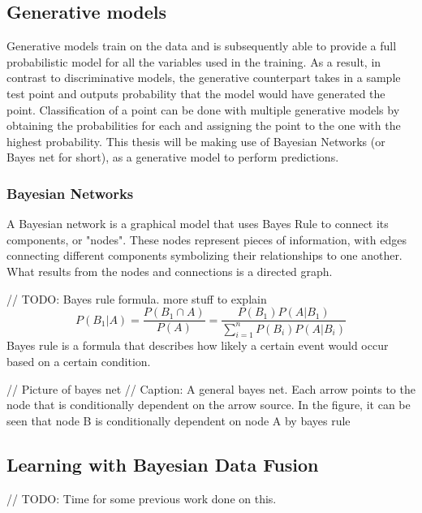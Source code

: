 \documentclass[12pt]{article}
\begin{document}
\subsection{Generative models}
Generative models train on the data and is subsequently able to provide a full probabilistic model for all the variables used in the training. As a result, in contrast to discriminative models, the generative counterpart takes in a sample test point and outputs probability that the model would have generated the point. Classification of a point can be done with multiple generative models by obtaining the probabilities for each and assigning the point to the one with the highest probability. %
This thesis will be making use of Bayesian Networks (or Bayes net for short), as a generative model to perform predictions. 

\subsubsection{Bayesian Networks}
A Bayesian network is a graphical model that uses Bayes Rule to connect its components, or "nodes". These nodes represent pieces of information, with edges connecting different components symbolizing their relationships to one another. What results from the nodes and connections is a directed graph. 

// TODO: Bayes rule formula. more stuff to explain
\[P(B_1|A)=\frac{P(B_1\cap A)}{P(A)}=\frac{P(B_1)P(A| B_1)}{\sum_{i=1}^{n} P(B_i)P(A|B_i)}\]
Bayes rule is a formula that describes how likely a certain event would occur based on a certain condition. 

// Picture of bayes net
// Caption: A general bayes net. Each arrow points to the node that is conditionally dependent on the arrow source. 
In the figure, it can be seen that node B is conditionally dependent on node A by bayes rule

\subsection{Learning with Bayesian Data Fusion}

// TODO: Time for some previous work done on this. 
\end{document}
